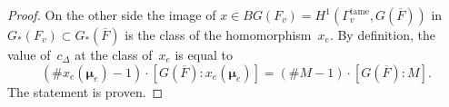 \documentclass[a4paper,english,12pt]{amsart}
\newcommand{\oF}{\overline F}
\newcommand{\Fv}{F_v}
\newcommand{\piv}{\pi_v}
\newcommand{\muu}{\boldsymbol{\mu}}
\DeclareMathOperator{\Spec}{Spec}
\DeclareMathOperator{\tame}{{tame}}
\numberwithin{equation}{subsection}
\begin{document}
\begin{proof}
On the other side the image of $x\in BG(F_v)=H^1(\Gamma_v^{\tame}, G(\oF))$ in $G_*(\Fv)\subset G_*(\oF)$ is the class of the homomorphism~$x_e$. By definition, the value of~$c_{\Delta}$ at the class of~$x_e$ is equal to $$(\# x_e(\muu_e)-1)\cdot [G(\oF): x_e(\muu_e)]=(\# M-1)\cdot [G(\oF):M].$$ The statement is proven.
%
%
\end{proof}
\end{document}
